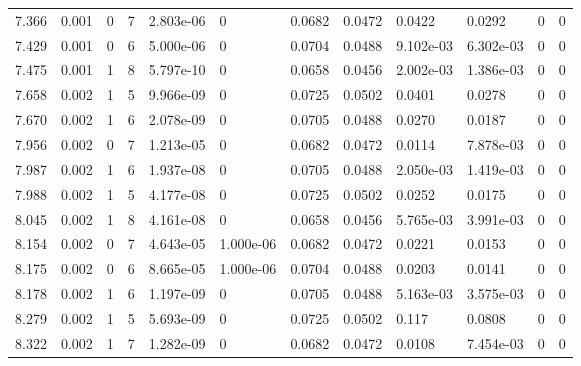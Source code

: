 \documentclass[preview]{standalone}
\begin{document}
{{{{\begin{tabular}{L{1.2cm}C{1.2cm} C{0.3cm}C{0.5cm} C{1.4cm}C{1.4cm} C{1.4cm}C{1.4cm} C{1.6cm}C{1.6cm} C{1.6cm}C{1.6cm}}
  7.366  &  0.001  & 0     &  7 &  2.803e-06  & 0  &  0.0682&   0.0472& 0.0422 & 0.0292   &  0 & 0  \\ 
  7.429  &  0.001  & 0     &  6 &  5.000e-06  & 0  &  0.0704&   0.0488& 9.102e-03 & 6.302e-03   &  0 & 0  \\ 
  7.475  &  0.001  & 1     &  8 &  5.797e-10  & 0  &  0.0658&   0.0456& 2.002e-03 & 1.386e-03   &  0 & 0  \\ 
  7.658  &  0.002  & 1     &  5 &  9.966e-09  & 0  &  0.0725&   0.0502& 0.0401 & 0.0278   &  0 & 0  \\ 
  7.670  &  0.002  & 1     &  6 &  2.078e-09  & 0  &  0.0705&   0.0488& 0.0270 & 0.0187   &  0 & 0  \\ 
  7.956  &  0.002  & 0     &  7 &  1.213e-05  & 0  &  0.0682&   0.0472& 0.0114 & 7.878e-03   &  0 & 0  \\ 
  7.987  &  0.002  & 1     &  6 &  1.937e-08  & 0  &  0.0705&   0.0488& 2.050e-03 & 1.419e-03   &  0 & 0  \\ 
  7.988  &  0.002  & 1     &  5 &  4.177e-08  & 0  &  0.0725&   0.0502& 0.0252 & 0.0175   &  0 & 0  \\ 
  8.045  &  0.002  & 1     &  8 &  4.161e-08  & 0  &  0.0658&   0.0456& 5.765e-03 & 3.991e-03   &  0 & 0  \\ 
  8.154  &  0.002  & 0     &  7 &  4.643e-05  & 1.000e-06  &  0.0682&   0.0472& 0.0221 & 0.0153   &  0 & 0  \\ 
  8.175  &  0.002  & 0     &  6 &  8.665e-05  & 1.000e-06  &  0.0704&   0.0488& 0.0203 & 0.0141   &  0 & 0  \\ 
  8.178  &  0.002  & 1     &  6 &  1.197e-09  & 0  &  0.0705&   0.0488& 5.163e-03 & 3.575e-03   &  0 & 0  \\ 
  8.279  &  0.002  & 1     &  5 &  5.693e-09  & 0  &  0.0725&   0.0502& 0.117 & 0.0808   &  0 & 0  \\ 
  8.322  &  0.002  & 1     &  7 &  1.282e-09  & 0  &  0.0682&   0.0472& 0.0108 & 7.454e-03   &  0 & 0  \\ 
\hline 
\end{tabular} 

}}}}
\end{document}
